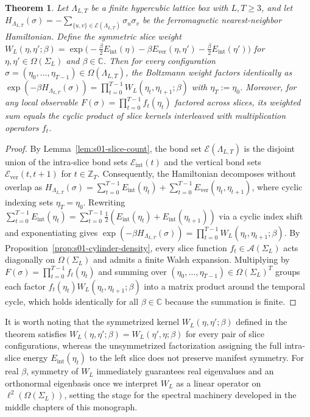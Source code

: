 \documentclass[11pt]{article}
\newtheorem{theorem}{Theorem}[section]
\theoremstyle{definition}
\begin{document}
\begin{theorem}
\label{thm:s01-factorization}
Let $\Lambda_{L,T}$ be a finite hypercubic lattice box with $L, T \ge 3$, and let
$H_{\Lambda_{L,T}}(\sigma) = -\sum_{\{u,v\} \in \mathcal{E}(\Lambda_{L,T})} \sigma_u
\sigma_v$ be the ferromagnetic nearest-neighbor Hamiltonian. Define the symmetric
slice weight $W_L(\eta, \eta'; \beta) = \exp\!\bigl(-\frac{\beta}{2}
E_{\mathrm{int}}(\eta) - \beta E_{\mathrm{ver}}(\eta, \eta') - \frac{\beta}{2}
E_{\mathrm{int}}(\eta')\bigr)$ for $\eta, \eta' \in \Omega(\Sigma_L)$ and $\beta \in
\mathbb{C}$. Then for every configuration $\sigma = (\eta_0, \dots, \eta_{T-1}) \in
\Omega(\Lambda_{L,T})$, the Boltzmann weight factors identically as $\exp(-\beta
H_{\Lambda_{L,T}}(\sigma)) = \prod_{t=0}^{T-1} W_L(\eta_t, \eta_{t+1}; \beta)$ with
$\eta_T := \eta_0$. Moreover, for any local observable $F(\sigma) =
\prod_{t=0}^{T-1} f_t(\eta_t)$ factored across slices, its weighted sum equals the
cyclic product of slice kernels interleaved with multiplication operators $f_t$.
\end{theorem}
\begin{proof}
By Lemma~\ref{lem:s01-slice-count}, the bond set $\mathcal{E}(\Lambda_{L,T})$ is the
disjoint union of the intra-slice bond sets $\mathcal{E}_{\mathrm{int}}(t)$ and the
vertical bond sets $\mathcal{E}_{\mathrm{ver}}(t, t+1)$ for $t \in \mathbb{Z}_T$.
Consequently, the Hamiltonian decomposes without overlap as
$H_{\Lambda_{L,T}}(\sigma) = \sum_{t=0}^{T-1} E_{\mathrm{int}}(\eta_t) +
\sum_{t=0}^{T-1} E_{\mathrm{ver}}(\eta_t, \eta_{t+1})$, where cyclic indexing sets
$\eta_T = \eta_0$. Rewriting $\sum_{t=0}^{T-1} E_{\mathrm{int}}(\eta_t) =
\sum_{t=0}^{T-1} \frac{1}{2}(E_{\mathrm{int}}(\eta_t) +
E_{\mathrm{int}}(\eta_{t+1}))$ via a cyclic index shift and exponentiating gives
$\exp(-\beta H_{\Lambda_{L,T}}(\sigma)) = \prod_{t=0}^{T-1} W_L(\eta_t, \eta_{t+1};
\beta)$. By Proposition~\ref{prop:s01-cylinder-density}, every slice function $f_t
\in \mathcal{A}(\Sigma_L)$ acts diagonally on $\Omega(\Sigma_L)$ and admits a finite
Walsh expansion. Multiplying by $F(\sigma) = \prod_{t=0}^{T-1} f_t(\eta_t)$ and
summing over $(\eta_0, \dots, \eta_{T-1}) \in \Omega(\Sigma_L)^T$ groups each factor
$f_t(\eta_t) W_L(\eta_t, \eta_{t+1}; \beta)$ into a matrix product around the
temporal cycle, which holds identically for all $\beta \in \mathbb{C}$ because the
summation is finite.
\end{proof}

It is worth noting that the symmetrized kernel $W_L(\eta, \eta'; \beta)$ defined in
the theorem satisfies $W_L(\eta, \eta'; \beta) = W_L(\eta', \eta; \beta)$ for every
pair of slice configurations, whereas the unsymmetrized factorization assigning the
full intra-slice energy $E_{\mathrm{int}}(\eta_t)$ to the left slice does not
preserve manifest symmetry. For real $\beta$, symmetry of $W_L$ immediately
guarantees real eigenvalues and an orthonormal eigenbasis once we interpret $W_L$ as
a linear operator on $\ell^2(\Omega(\Sigma_L))$, setting the stage for the spectral
machinery developed in the middle chapters of this monograph.
\end{document}
